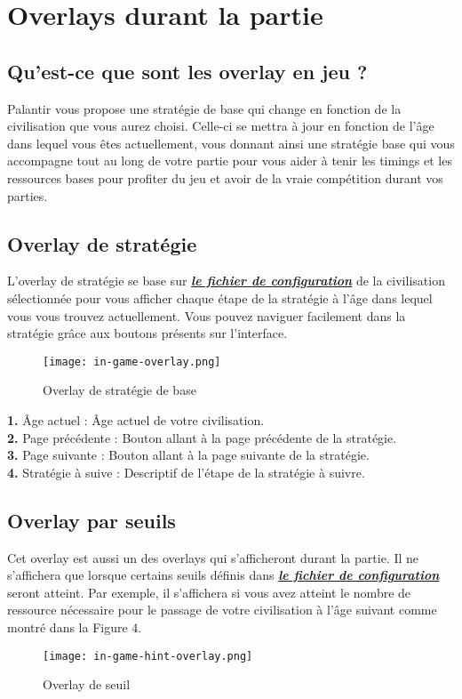 
\label{sec:overlays}
\section{Overlays durant la partie}
\subsection{Qu'est-ce que sont les overlay en jeu ?}
Palantir vous propose une stratégie de base qui change en fonction de la civilisation que vous aurez choisi. Celle-ci se mettra à jour en fonction de l'âge dans lequel vous êtes actuellement, vous donnant ainsi une stratégie base qui vous accompagne tout au long de votre partie pour vous aider à tenir les timings et les ressources bases pour profiter du jeu et avoir de la vraie compétition durant vos parties.

\subsection{Overlay de stratégie}
L'overlay de stratégie se base sur \hyperref[sec:configfiles]{\textbf{\textit{le fichier de configuration}}} de la civilisation sélectionnée pour vous afficher chaque étape de la stratégie à l'âge dans lequel vous vous trouvez actuellement. Vous pouvez naviguer facilement dans la stratégie grâce aux boutons présents sur l'interface.

\begin{figure}[ht!]
    \begin{center}
        \texttt{[image: in-game-overlay.png]}
    \end{center}
    \caption{Overlay de stratégie de base}
\end{figure}

\textbf{1.} Âge actuel : Âge actuel de votre civilisation.\\
\textbf{2.} Page précédente : Bouton allant à la page précédente de la stratégie.\\
\textbf{3.} Page suivante : Bouton allant à la page suivante de la stratégie.\\
\textbf{4.} Stratégie à suive : Descriptif de l'étape de la stratégie à suivre.

\newpage

\subsection{Overlay par seuils}
Cet overlay est aussi un des overlays qui s'afficheront durant la partie. Il ne s'affichera que lorsque certains seuils définis dans \hyperref[sec:configfiles]{\textbf{\textit{le fichier de configuration}}} seront atteint. Par exemple, il s'affichera si vous avez atteint le nombre de ressource nécessaire pour le passage de votre civilisation à l'âge suivant comme montré dans la Figure 4.

\begin{figure}[ht!]
    \begin{center}
        \texttt{[image: in-game-hint-overlay.png]}
    \end{center}
    \caption{Overlay de seuil}
\end{figure}